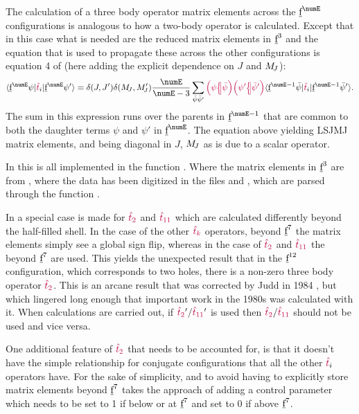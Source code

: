 \documentclass[11pt, twoside,openright]{article}
\begin{document}
The calculation of a three body operator matrix elements across the $\forb^{\numE}$ configurations is analogous to how a two-body operator is calculated. Except that in this case what is needed are the reduced matrix elements in $\underbar{\text{f}}^3$ and the equation that is used to propagate these across the other configurations is equation 4 of \cite{judd_three-particle_1966} (here adding the explicit dependence on $J$ and $M_{\!{J}}$):
\begin{equation} 
	\braopket{\forb^{\numE}\psi}
		{\op{t}_i}
		{\forb^{\numE}\psi'} =
		\kronecker{J}{J'}
		\kronecker{\Msub{J}}{\Msub{J}'} 
		\frac{\numE}{\numE-3} 
		\sum_{\bar{\psi}\bar{\psi}'}
			\cfpinv{\psi}{\bar{\psi}}
        	\cfpinv{\psi'}{\bar{\psi}'}
        	\braopket{\forb^{\numE-1}\bar{\psi}}{\op{t}_i}{\forb^{\numE-1}\bar{\psi}'}.
\label{eqn:three body escalator}
\end{equation}
The sum in this expression runs over the parents in $\forb^{\numE-1}$ that are common to both the daughter terms $\psi$ and $\psi'$ in $\forb^{\numE}$. The equation above yielding LSJMJ matrix elements, and being diagonal in $J$, $M_{\!{J}}$ as is due to a scalar operator.

In \qlanth this is all implemented in the function . Where the matrix elements in $\underbar{\text{f}}^3$ are from \cite{judd_complete_1984}, where the data has been digitized in the files  and , which are parsed through the function .
 
 In  a special case is made for $\textcolor{purple}{\textcolor{purple}{\hat{t}}_{2}}$ and $\textcolor{purple}{\textcolor{purple}{\hat{t}}_{11}}$ which are calculated differently beyond the half-filled shell. In the case of the other $\textcolor{purple}{\textcolor{purple}{\hat{t}}_{k}}$ operators, beyond $\underbar{\text{f}}^7$ the matrix elements simply see a global sign flip, whereas in the case of $\textcolor{purple}{\textcolor{purple}{\hat{t}}_{2}}$ and $\textcolor{purple}{\textcolor{purple}{\hat{t}}_{11}}$ the \cfps beyond $\underbar{\text{f}}^7$ are used. This yields the unexpected result that in the $\underbar{\text{f}}^{12}$ configuration, which corresponds to two holes, there is a non-zero three body operator $\textcolor{purple}{\textcolor{purple}{\hat{t}}_{2}}$. This is an arcane result that was corrected by Judd in 1984 \cite{judd_complete_1984}, but which lingered long enough that important work in the 1980s was calculated with it. When calculations are carried out, if $\textcolor{purple}{\textcolor{purple}{\hat{t}}_{2}}'/\textcolor{purple}{\textcolor{purple}{\hat{t}}_{11}}'$ is used then $\textcolor{purple}{\textcolor{purple}{\hat{t}}_{2}}/\textcolor{purple}{\textcolor{purple}{\hat{t}}_{11}}$ should not be used and vice versa.
 
 One additional feature of $\textcolor{purple}{\textcolor{purple}{\hat{t}}_{2}}$ that needs to be accounted for, is that it doesn't have the simple relationship for conjugate configurations that all the other $\textcolor{purple}{\hat{t}}_i$ operators have. For the sake of simplicity, and to avoid having to explicitly store matrix elements beyond $\underbar{\text{f}}^7$ \qlanth takes the approach of adding a control parameter  which needs to be set to 1 if below or at $\underbar{\text{f}}^7$ and set to 0 if above $\underbar{\text{f}}^7$. 
 
\end{document}
